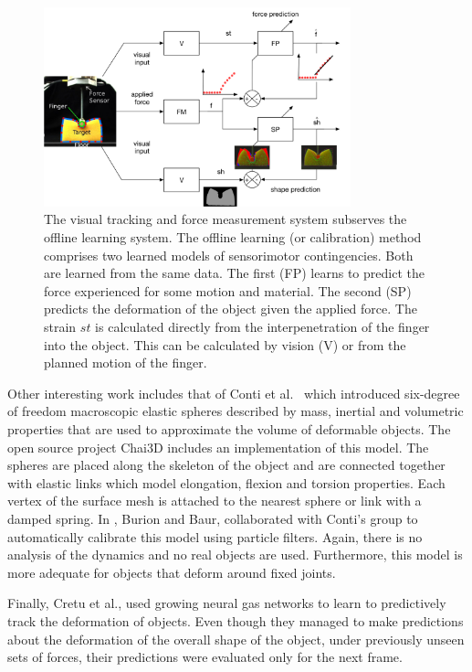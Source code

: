 \documentclass[journal]{IEEEtran}
\newcommand{\comment}[1]{{\color{red} #1}}
\begin{document}
\begin{figure}[!t]
\centering
\includegraphics[width=3.5in]{figures/learning.png}%
\caption{\comment{The visual tracking and force measurement system subserves the offline learning system. The offline learning (or calibration) method comprises two learned models of sensorimotor contingencies.} Both are learned from the same data. The first (FP) learns to predict the force experienced for some motion and material. The second (SP) predicts the deformation of the object given the applied force. The strain $st$ is calculated directly from the interpenetration of the finger into the object. This can be calculated by vision (V) or from the planned motion of the finger.}
\label{fig:learning}
\end{figure}

Other interesting work includes that of Conti et al.\ \cite{Conti2003} which introduced six-degree of freedom macroscopic elastic spheres described by mass, inertial and volumetric properties that are used to approximate the volume of deformable objects. The open source project Chai3D includes an implementation of this model. The spheres are placed along the skeleton of the object and are connected together with elastic links which model elongation, flexion and torsion properties. Each vertex of the surface mesh is attached to the nearest sphere or link with a damped spring.  In \cite{Burion2008}, Burion and Baur, collaborated with Conti's group to automatically calibrate this model using particle filters.  Again, there is no analysis of the dynamics and no real objects are used.  Furthermore, this model is more adequate for objects that deform around fixed joints.

Finally, Cretu et al., used growing neural gas networks to learn to predictively track the deformation of objects.  Even though they managed to make predictions about the deformation of the overall shape of the object, under previously unseen sets of forces, their predictions were evaluated only for the next frame.
\end{document}
